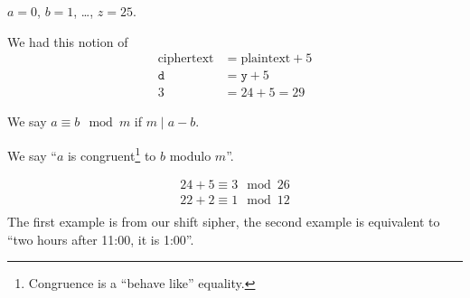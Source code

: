 $a = 0$, $b = 1$, \dots, $z=25$.

We had this notion of
\begin{align*}
    \text{ciphertext} & = \text{plaintext} + 5 \\
    \mathtt{d}        & = \mathtt{y} + 5       \\
    3                 & = 24+5 = 29
\end{align*}

\begin{definition}
    We say $a\equiv b\mod{m}$ if $m\mid a - b$.

    We say ``$a$ is congruent\footnote{Congruence is a ``behave like'' equality.} to $b$ modulo $m$''.
\end{definition}
\begin{example}
    \begin{align*}
        24 + 5 \equiv 3\mod{26} \\
        22 + 2 \equiv 1\mod{12} \\
    \end{align*}
    The first example is from our shift sipher, the second example is equivalent to ``two hours after 11:00, it is 1:00''.
\end{example}

